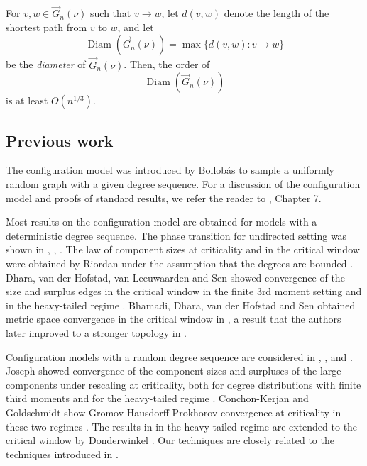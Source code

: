 \begin{corollary}
For $v,w\in \vec{G}_n(\nu)$ such that $v\to w$, let $d(v,w)$ denote the length of the shortest path from $v$ to $w$, and let $$\operatorname{Diam}\left(\vec{G}_n(\nu)\right)=\max\{d(v,w):v\to w\}$$ be the \emph{diameter} of $\vec{G}_n(\nu)$. Then, the order of $$\operatorname{Diam}\left(\vec{G}_n(\nu)\right)$$ is at least $O(n^{1/3})$.
\end{corollary}


\subsection{Previous work}
The configuration model was introduced by Bollobás \cite{Bollobas1980} to sample a uniformly random graph with a given degree sequence. For a discussion of the configuration model and proofs of standard results, we refer the reader to \cite{hofstadRandomGraphsComplex2017}, Chapter 7.   

Most results on the configuration model are obtained for models with a deterministic degree sequence. The phase transition for undirected setting was shown in \cite{molloyCriticalPointRandom1995}, \cite{Molloy1998}, \cite{Janson2009}. The law of component sizes at criticality and in the critical window were obtained by Riordan  under the assumption that the degrees are bounded \cite{Riordan2012}. Dhara, van der Hofstad, van Leeuwaarden and Sen showed convergence of the size and surplus edges in the critical window in the finite 3rd moment setting \cite{Dhara2017} and in the heavy-tailed regime \cite{Dhara2020}.  Bhamadi, Dhara, van der Hofstad and Sen obtained metric space convergence in the critical window in \cite{Bhamidi2020}, a result that the authors later improved to a stronger topology in \cite{Bhamidi2020Glmb}. 

Configuration models with a random degree sequence are considered in \cite{josephComponentSizesCritical2014}, \cite{conchon--kerjanStableGraphMetric2020}, and \cite{Donderwinkel2021heightprocess}. Joseph showed convergence of the component sizes and surpluses of the large components under rescaling at criticality, both for degree distributions with finite third moments and for the heavy-tailed regime \cite{josephComponentSizesCritical2014}. Conchon-Kerjan and Goldschmidt show Gromov-Hausdorff-Prokhorov convergence at criticality in these two regimes \cite{conchon--kerjanStableGraphMetric2020}. The results in \cite{conchon--kerjanStableGraphMetric2020} in the heavy-tailed regime are extended to the critical window by Donderwinkel \cite{Donderwinkel2021heightprocess}. Our techniques are closely related to the techniques introduced in \cite{conchon--kerjanStableGraphMetric2020}. 

